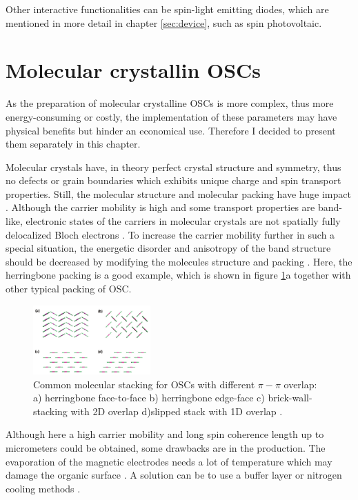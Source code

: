 Other interactive functionalities can be spin-light emitting diodes, which are mentioned in more detail in chapter \ref{sec:device}, such as spin photovoltaic.

\section{Molecular crystallin OSCs}
\label{sec:2D}

As the preparation of molecular crystalline OSCs is more complex, thus more energy-consuming or costly, the implementation of these parameters may have physical benefits but hinder an economical use.
Therefore I decided to present them separately in this chapter.

Molecular crystals have, in theory perfect crystal structure and symmetry, thus no defects or grain boundaries which exhibits unique charge and spin transport properties.
Still, the molecular structure and molecular packing have huge impact \cite{single-crystals}.
Although the carrier mobility is high and some transport properties are band-like, electronic states of the carriers in molecular crystals are not spatially fully delocalized Bloch electrons \cite{perovskite}.
To increase the carrier mobility further in such a special situation, the energetic disorder and anisotropy of the band structure should be decreased by modifying the molecules structure and packing \cite{perovskite}.
Here, the herringbone packing is a good example, which is shown in figure \ref{fig:packing}a together with other typical packing of OSC.

\begin{figure}
    \centering
  \captionsetup{width=0.9\linewidth}
  \includegraphics[width=0.4\textwidth]{graphics/packing.png}
  \caption{Common molecular stacking for OSCs with different $\pi - \pi$ overlap: a) herringbone face-to-face b) herringbone edge-face c) brick-wall-stacking with 2D overlap d)slipped stack with 1D overlap \cite{single-crystals}.}
  \label{fig:packing}
\end{figure}

Although here a high carrier mobility and long spin coherence length up to micrometers \cite{single-crystals} could be obtained, some drawbacks are in the production.
The evaporation of the magnetic electrodes needs a lot of temperature which may damage the organic surface \cite{perovskite} \cite{single-crystals}.
A solution can be to use a buffer layer or nitrogen cooling methods \cite{perovskite}.

